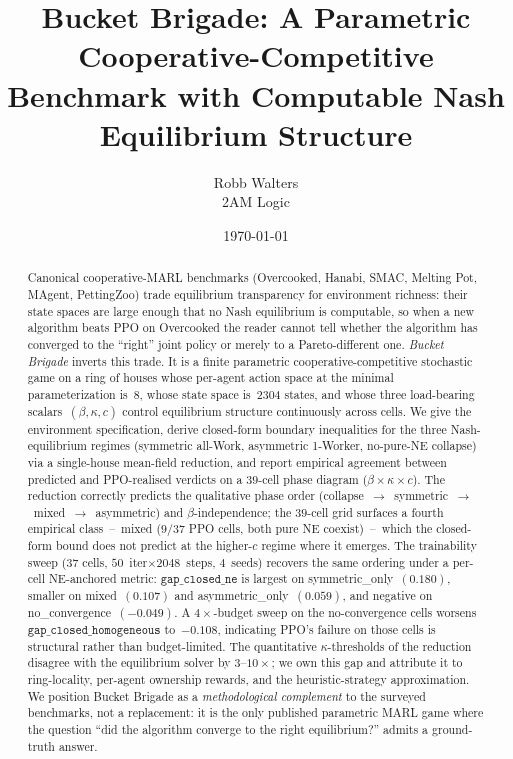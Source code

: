 \documentclass{anvil-paper}
\title{Bucket Brigade: A Parametric Cooperative-Competitive Benchmark with
Computable Nash Equilibrium Structure}
\author{Robb Walters \\ 2AM Logic}
\date{\today}
\begin{document}
\maketitle

\begin{abstract}
Canonical cooperative-MARL benchmarks (Overcooked, Hanabi, SMAC, Melting Pot,
MAgent, PettingZoo) trade equilibrium transparency for environment richness:
their state spaces are large enough that no Nash equilibrium is computable, so
when a new algorithm beats PPO on Overcooked the reader cannot tell whether
the algorithm has converged to the ``right'' joint policy or merely to a
Pareto-different one. \emph{Bucket Brigade} inverts this trade. It is a finite
parametric cooperative-competitive stochastic game on a ring of houses whose
per-agent action space at the minimal parameterization is~$8$, whose state
space is~$2304$ states, and whose three load-bearing scalars~$(\beta,\kappa,c)$
control equilibrium structure continuously across cells. We give the
environment specification, derive closed-form boundary inequalities for the
three Nash-equilibrium regimes (symmetric all-Work, asymmetric 1-Worker,
no-pure-NE collapse) via a single-house mean-field reduction, and report
empirical agreement between predicted and PPO-realised verdicts on a
$39$-cell phase diagram ($\beta{\times}\kappa{\times}c$). The reduction
correctly predicts the qualitative phase order
(collapse~$\to$~symmetric~$\to$~mixed~$\to$~asymmetric) and
$\beta$-independence; the $39$-cell grid surfaces a fourth empirical
class~--~\textsf{mixed} ($9/37$ PPO cells, both pure NE coexist)~--~which
the closed-form bound does not predict at the higher-$c$ regime where it
emerges. The trainability sweep ($37$ cells, $50$~iter${\times}2048$~steps,
$4$~seeds) recovers the same ordering under a per-cell NE-anchored metric:
$\texttt{gap\_closed\_ne}$ is largest on \textsf{symmetric\_only}~$(0.180)$,
smaller on \textsf{mixed}~$(0.107)$ and \textsf{asymmetric\_only}~$(0.059)$,
and negative on \textsf{no\_convergence}~$(-0.049)$. A
$4{\times}$-budget sweep on the no-convergence cells worsens
$\texttt{gap\_closed\_homogeneous}$ to~$-0.108$, indicating PPO's failure on
those cells is structural rather than budget-limited. The quantitative
$\kappa$-thresholds of the reduction disagree with the equilibrium solver
by $3$--$10\times$; we own this gap and attribute it to ring-locality,
per-agent ownership rewards, and the heuristic-strategy approximation. We position Bucket Brigade as a \emph{methodological
complement} to the surveyed benchmarks, not a replacement: it is the only
published parametric MARL game where the question ``did the algorithm
converge to the right equilibrium?'' admits a ground-truth answer.
\end{abstract}
\end{document}
